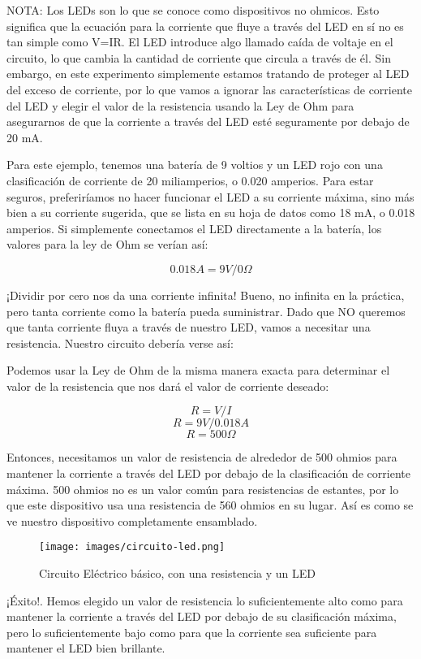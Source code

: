 \documentclass[output=paper, 
colorlinks,
citecolor=brown,
newtxmath
]{langscibook}
\begin{document}
NOTA: Los LEDs son lo que se conoce como dispositivos no ohmicos. Esto significa que la ecuación para la corriente que fluye a través del LED en sí no es tan simple como V=IR. El LED introduce algo llamado caída de voltaje en el circuito, lo que cambia la cantidad de corriente que circula a través de él. Sin embargo, en este experimento simplemente estamos tratando de proteger al LED del exceso de corriente, por lo que vamos a ignorar las características de corriente del LED y elegir el valor de la resistencia usando la Ley de Ohm para asegurarnos de que la corriente a través del LED esté seguramente por debajo de 20 mA.

Para este ejemplo, tenemos una batería de 9 voltios y un LED rojo con una clasificación de corriente de 20 miliamperios, o 0.020 amperios. Para estar seguros, preferiríamos no hacer funcionar el LED a su corriente máxima, sino más bien a su corriente sugerida, que se lista en su hoja de datos como 18 mA, o 0.018 amperios. Si simplemente conectamos el LED directamente a la batería, los valores para la ley de Ohm se verían así:

\[0.018A = 9V / 0Ω\]

¡Dividir por cero nos da una corriente infinita! Bueno, no infinita en la práctica, pero tanta corriente como la batería pueda suministrar. Dado que NO queremos que tanta corriente fluya a través de nuestro LED, vamos a necesitar una resistencia. Nuestro circuito debería verse así:

Podemos usar la Ley de Ohm de la misma manera exacta para determinar el valor de la resistencia que nos dará el valor de corriente deseado:

\[R = V / I\]
\[R = 9V / 0.018A\]
\[R = 500Ω\]

Entonces, necesitamos un valor de resistencia de alrededor de 500 ohmios para mantener la corriente a través del LED por debajo de la clasificación de corriente máxima. 500 ohmios no es un valor común para resistencias de estantes, por lo que este dispositivo usa una resistencia de 560 ohmios en su lugar. Así es como se ve nuestro dispositivo completamente ensamblado.

 
\begin{figure}[H]
\texttt{[image: images/circuito-led.png]}
\caption{Circuito Eléctrico básico, con una resistencia y un LED}
\label{fig:unidades}
\end{figure}



¡Éxito!. Hemos elegido un valor de resistencia lo suficientemente alto como para mantener la corriente a través del LED por debajo de su clasificación máxima, pero lo suficientemente bajo como para que la corriente sea suficiente para mantener el LED bien brillante.
\end{document}
